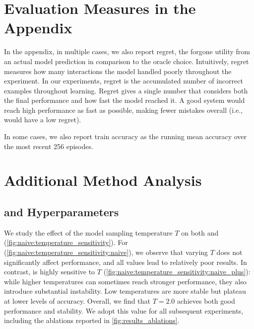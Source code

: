 \newcommand{\boxcomment}[1]{\textcolor{blue}{\emph{\dotfill(#1)}}}

\section{Evaluation Measures in the Appendix}

In the appendix, in multiple cases, we also report regret, the forgone utility from an actual model prediction in comparison to the oracle choice. 
Intuitively, regret measures how many interactions the model handled poorly throughout the experiment. 
In our experiments, regret is the accumulated number of incorrect examples throughout learning. 
Regret gives a single number that considers both the final performance and how fast the model reached it. 
A good system would reach high performance as fast as possible, making fewer mistakes overall (i.e., would have a low regret).

In some cases, we also report train accuracy as the running mean accuracy over the most recent 256 episodes. 


\section{Additional Method Analysis}\label{appendix:icrl}


    

    

\subsection{\naiveshort and \naiveplus Hyperparameters}

We study the effect of the model sampling temperature $T$ on both \naiveshort and \naiveplus (\autoref{fig:naive:temperature_sensitivity}). For \naiveshort (\autoref{fig:naive:temperature_sensitivity:naive}), we observe that varying $T$ does not significantly affect performance, and all values lead to relatively poor results. 
In contrast, \naiveplus is highly sensitive to $T$ (\autoref{fig:naive:temperature_sensitivity:naive_plus}): while higher temperatures can sometimes reach stronger performance, they also introduce substantial instability. 
Low temperatures are more stable but plateau at lower levels of accuracy. Overall, we find that $T=2.0$ achieves both good performance and stability. 
We adopt this value for all subsequent \naiveplusshort experiments, including the ablations reported in \autoref{fig:results_ablations}.

